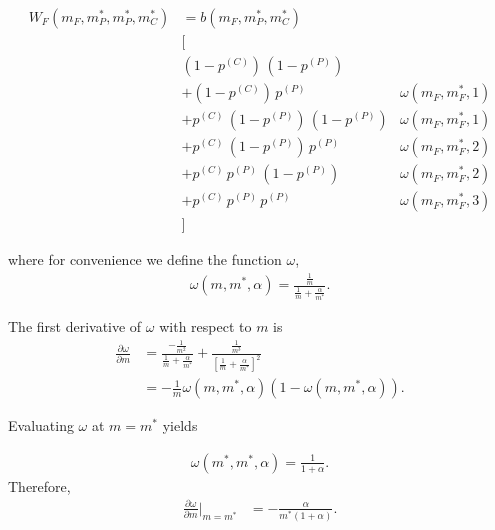 \begin{align}
  \label{eq:W_F}
  W_F(m_F,m_P^*,m_P^*,m_C^*) &= b(m_F,m_P^*,m_C^*)  & \nonumber \\ 
  &\big[& \nonumber \\
  &(1-p^{(C)}) \, (1-p^{(P)})& \nonumber \\
  &+(1-p^{(C)}) \, p^{(P)}& \omega(m_F,m_F^*,1) \nonumber \\
  &+p^{(C)} \, (1-p^{(P)}) \, (1-p^{(P)})& \omega(m_F,m_F^*,1) \nonumber \\
  &+p^{(C)} \, (1-p^{(P)}) \, p^{(P)}& \omega(m_F,m_F^*,2) \nonumber \\
  &+p^{(C)} \, p^{(P)} \, (1-p^{(P)})& \omega(m_F,m_F^*,2) \nonumber \\
  &+p^{(C)} \, p^{(P)} \, p^{(P)} & \omega(m_F,m_F^*,3) \nonumber \\
  &\big]
\end{align}

\noindent where for convenience we define the function $\omega$,
\begin{align*}
\omega(m,m^*,\alpha) = \frac{ \frac{1}{m} }{ \frac{1}{m}+\frac{\alpha}{m^*} }.
\end{align*}

\noindent The first derivative of $\omega$ with respect to $m$ is
\begin{align*}
    \frac{\partial \omega}{\partial m} &= \frac{ -\frac{1}{m^2} }{ \frac{1}{m}+\frac{\alpha}{m^*} }+ \frac{ \frac{1}{m^3} }{ [\frac{1}{m}+\frac{\alpha}{m^*}]^2 }\\
    &=-\frac{1}{m}\omega(m,m^*,\alpha)(1-\omega(m,m^*,\alpha)).
\end{align*}

\noindent Evaluating $\omega$ at $m=m^*$ yields

\begin{align*}
    \omega(m^*,m^*,\alpha) = \frac{1}{1+\alpha}.
\end{align*}
Therefore,
\begin{align*}
  \frac{\partial \omega}{\partial m}|_{m=m^*} &=  -\frac{\alpha}{m^*(1+\alpha)}. 
\end{align*}


